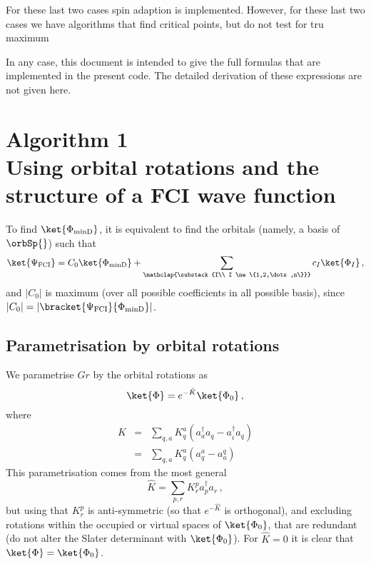 \documentclass[a4paper,11pt]{article}
\begin{document}
For these last two cases spin adaption is implemented.
However, for these last two cases we have algorithms that find critical points, but do not test for tru maximum

In any case, this document is intended to give the full formulas that are implemented in the present code.
The detailed derivation of these expressions are not given here.


\newpage
\section{\textsf{\LARGE Algorithm 1}\\Using orbital rotations and the structure of a FCI wave function}

To find $\ket{\Phi_\text{minD}}$, it is equivalent to find the orbitals (namely, a basis of $\orbSp{}$) such that 
\begin{equation}
  \ket{\Psi_\text{FCI}} = C_0 \ket{\Phi_\text{minD}} +
  \sum_{
    \mathclap{\substack{I\\
        I \ne \{1,2,\dots,n\}}}
      }
    c_I \ket{\Phi_I}\,,
\end{equation}
and $|C_0|$ is maximum (over all possible coefficients in all possible basis), since $|C_0| = |\bracket{\Psi_\text{FCI}}{\Phi_\text{minD}}|$.

\subsection{Parametrisation by orbital rotations}
We parametrise $Gr$ by the orbital rotations as\cite{}
\begin{equation}
  \ket{\Phi} = e^{-\hat{K}} \ket{\Phi_0}\,,
\end{equation}
where
\begin{eqnarray}
  \hat{K} &=& \sum_{q,a} K_q^a(a_a^\dagger a_q - a_i^\dagger a_q)\\
          &=& \sum_{q,a} K_q^a(a_q^a - a_a^q)\,
\end{eqnarray}
This parametrisation comes from the most general 
\begin{equation}
  \hat{K} = \sum_{p,r} K_r^pa_p^\dagger a_r\,,
\end{equation}
but using that $K_r^p$ is anti-symmetric (so that $e^{-\hat{K}}$ is orthogonal), and excluding rotations within the occupied or virtual spaces of $\ket{\Phi_0}$, that are redundant (do not alter the Slater determinant with $\ket{\Phi_0}$).
For $\hat{K} = 0$ it is clear that $\ket{\Phi} = \ket{\Phi_0}$.
\end{document}
